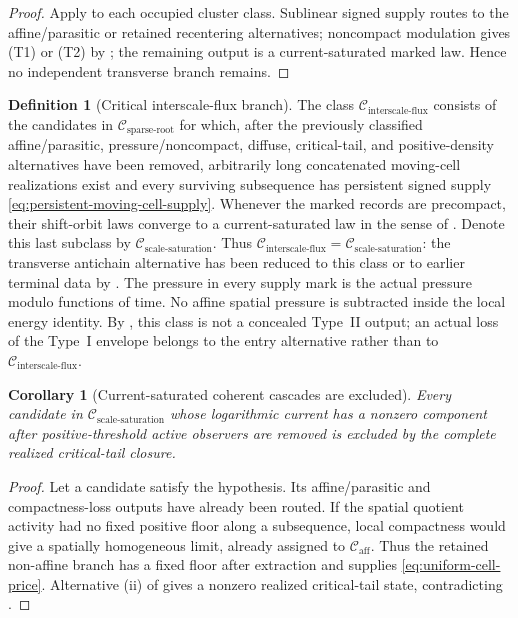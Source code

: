 \documentclass[11pt]{amsart}
\numberwithin{equation}{section}
\theoremstyle{plain}
\newtheorem{corollary}[corollary]{Corollary}
\theoremstyle{definition}
\newtheorem{definition}[definition]{Definition}
\theoremstyle{remark}
\newcommand{\Caff}{\mathcal C_{\mathrm{aff}}}
\newcommand{\Csparse}{\mathcal C_{\mathrm{sparse\text{-}root}}}
\newcommand{\Cisf}{\mathcal C_{\mathrm{interscale\text{-}flux}}}
\newcommand{\Csat}{\mathcal C_{\mathrm{scale\text{-}saturation}}}
\begin{document}
\begin{proof}
Apply  to each occupied cluster
class.  Sublinear signed supply routes to the affine/parasitic or retained
recentering alternatives; noncompact modulation gives \textup{(T1)} or
\textup{(T2)} by ; the remaining output
is a current-saturated marked law.  Hence no independent transverse branch
remains.
\end{proof}

\begin{definition}[Critical interscale-flux branch]
\label{def:critical-interscale-flux-branch}
The class \(\Cisf\) consists of the candidates in \(\Csparse\) for which,
after the previously classified affine/parasitic, pressure/noncompact,
diffuse, critical-tail, and positive-density alternatives have been removed,
arbitrarily long concatenated moving-cell realizations exist and every
 surviving subsequence has persistent signed supply
 \eqref{eq:persistent-moving-cell-supply}.  Whenever the marked records are
 precompact, their shift-orbit laws converge to a current-saturated law in the
 sense of .  Denote this last subclass by
 \(\Csat\).  Thus \(\Cisf=\Csat\): the transverse antichain alternative has
been reduced to this class or to earlier terminal data by
.
The pressure in every supply mark is the actual pressure modulo functions of
time.  No affine spatial pressure is subtracted inside the local energy
identity.  By , this class is not a
concealed Type~II output; an actual loss of
the Type~I envelope belongs to the entry alternative rather than to
\(\Cisf\).
\end{definition}

\begin{corollary}[Current-saturated coherent cascades are excluded]
\label{cor:current-saturated-cascade-exclusion}
Every candidate in \(\Csat\) whose logarithmic current has a nonzero component
after positive-threshold active observers are removed is excluded by the
complete realized critical-tail closure.
\end{corollary}

\begin{proof}
Let a candidate satisfy the hypothesis.  Its affine/parasitic and
compactness-loss outputs have already been routed.  If the spatial quotient
activity had no fixed positive floor along a subsequence, local compactness
would give a spatially homogeneous limit, already assigned to \(\Caff\).
Thus the retained non-affine branch has a fixed floor after extraction and
 supplies
\eqref{eq:uniform-cell-price}.  Alternative \textup{(ii)} of
 gives a nonzero realized
critical-tail state, contradicting
.
\end{proof}
\end{document}
